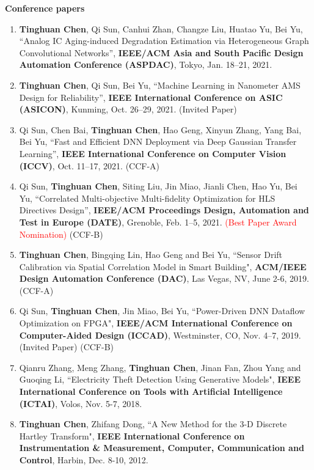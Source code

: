 \documentclass[letterpaper,11pt]{article}%
\begin{document}
\textbf{Conference papers}

\begin{enumerate}[(1)]


\item \textbf{Tinghuan Chen}, Qi Sun, Canhui Zhan, Changze Liu, Huatao Yu, Bei Yu, ``Analog IC Aging-induced Degradation Estimation via Heterogeneous Graph Convolutional Networks'', \textbf{IEEE/ACM Asia and South Pacific Design Automation Conference (ASPDAC)}, Tokyo, Jan. 18–21, 2021. 

\item \textbf{Tinghuan Chen}, Qi Sun, Bei Yu, ``Machine Learning in Nanometer AMS Design for Reliability'', \textbf{IEEE International Conference on ASIC (ASICON)}, Kunming, Oct. 26–29, 2021. (Invited Paper)

\item Qi Sun, Chen Bai, \textbf{Tinghuan Chen}, Hao Geng, Xinyun Zhang, Yang Bai, Bei Yu, ``Fast and Efficient DNN Deployment via Deep Gaussian Transfer Learning'', \textbf{IEEE International Conference on Computer Vision (ICCV)}, Oct. 11–17, 2021. (CCF-A)

\item Qi Sun, \textbf{Tinghuan Chen}, Siting Liu, Jin Miao, Jianli Chen, Hao Yu, Bei Yu, ``Correlated Multi-objective Multi-fidelity Optimization for HLS Directives Design'', \textbf{IEEE/ACM Proceedings Design, Automation and Test in Europe (DATE)}, Grenoble, Feb. 1–5, 2021. \textcolor{red}{(Best Paper Award Nomination)} (CCF-B)


\item \textbf{Tinghuan Chen}, Bingqing Lin, Hao Geng and Bei Yu, ``Sensor Drift Calibration via Spatial Correlation Model in Smart Building", \textbf{ACM/IEEE Design Automation Conference (DAC)}, Las Vegas, NV, June 2-6, 2019. (CCF-A)

\item Qi Sun, \textbf{Tinghuan Chen}, Jin Miao, Bei Yu, ``Power-Driven DNN Dataflow Optimization on FPGA", \textbf{IEEE/ACM International Conference on Computer-Aided Design (ICCAD)}, Westminster, CO, Nov. 4–7, 2019. (Invited Paper) (CCF-B)


\item Qianru Zhang, Meng Zhang, \textbf{Tinghuan Chen}, Jinan Fan, Zhou Yang and Guoqing Li, ``Electricity Theft Detection Using Generative Models", \textbf{IEEE International Conference on Tools with Artificial Intelligence (ICTAI)}, Volos, Nov. 5-7, 2018.


\item \textbf{Tinghuan Chen}, Zhifang Dong, ``A New Method for the 3-D Discrete Hartley Transform", \textbf{IEEE International Conference on Instrumentation \& Measurement, Computer, Communication and Control}, Harbin, Dec. 8-10, 2012.

\end{enumerate}
\end{document}
